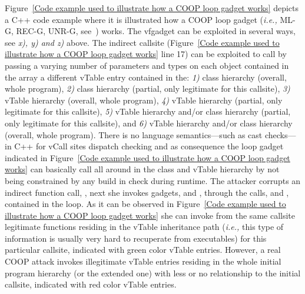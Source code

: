 % 


Figure~\ref{Code example used to illustrate how a COOP loop gadget works}
depicts a C++ code example where it is illustrated how a COOP loop gadget 
(\textit{i.e.,} ML-G, REC-G, UNR-G, see~\cite{crane:readactor++}) works.
The vfgadget  can be exploited in several ways, see \textit{x), y) and z)} above.
The indirect callsite (Figure~\ref{Code example used to illustrate how a COOP loop gadget works} line 17) can be exploited 
to call by passing a varying number of parameters and types
on each object contained in the array a different
vTable entry contained in the:
\textit{1)} class hierarchy (overall, whole program),
\textit{2)} class hierarchy (partial, only legitimate for this callsite),
\textit{3)} vTable hierarchy (overall, whole program),
\textit{4)} vTable hierarchy (partial, only legitimate for this callsite),
\textit{5)} vTable hierarchy and/or class hierarchy (partial, only legitimate for this callsite), and
\textit{6)} vTable hierarchy and/or class hierarchy (overall, whole program).
There is no language semantics---such as cast checks---in C++ for vCall sites dispatch checking and as consequence
the loop gadget indicated in Figure~\ref{Code example used to illustrate how a COOP loop gadget works}
can basically call all around in the class and vTable hierarchy by not being constrained by any build in check during
runtime. The attacker corrupts an indirect function call, , 
next she invokes gadgets,   and , 
through the calls,  and , contained in the loop. 
As it can be observed in Figure~\ref{Code example used to illustrate how a COOP loop gadget works} she 
can invoke from the same callsite legitimate functions residing in the vTable inheritance path
(\textit{i.e.,} this type of information is usually very hard to recuperate from executables)
for this particular callsite, indicated with green color vTable entries. 
However, a real COOP attack invokes illegitimate
vTable entries residing in the whole initial program hierarchy (or the extended one)
with less or no relationship to the initial callsite,
indicated with red color vTable entries.

